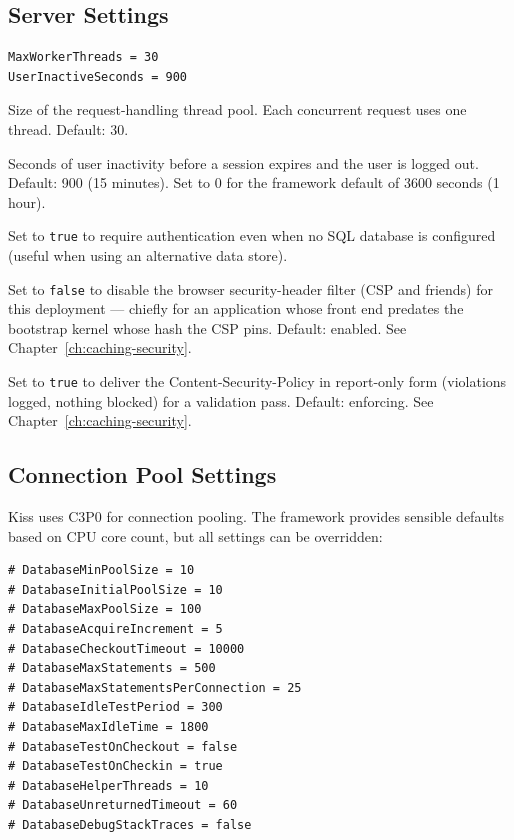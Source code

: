 \subsection{Server Settings}

\begin{lstlisting}[style=ini]
MaxWorkerThreads = 30
UserInactiveSeconds = 900
\end{lstlisting}

\begin{description}[style=nextline]
  \item[\texttt{MaxWorkerThreads}] Size of the request-handling thread pool.  Each concurrent request uses one thread.  Default: 30.
  \item[\texttt{UserInactiveSeconds}] Seconds of user inactivity before a session expires and the user is logged out.  Default: 900 (15 minutes).  Set to 0 for the framework default of 3600 seconds (1 hour).
  \item[\texttt{RequireAuthentication}] Set to \texttt{true} to require authentication even when no SQL database is configured (useful when using an alternative data store).
  \item[\texttt{SecurityHeaders}] Set to \texttt{false} to disable the browser security-header filter (CSP and friends) for this deployment --- chiefly for an application whose front end predates the bootstrap kernel whose hash the CSP pins.  Default: enabled.  See Chapter~\ref{ch:caching-security}.
  \item[\texttt{CspReportOnly}] Set to \texttt{true} to deliver the Content-Security-Policy in report-only form (violations logged, nothing blocked) for a validation pass.  Default: enforcing.  See Chapter~\ref{ch:caching-security}.
\end{description}

\subsection{Connection Pool Settings}

Kiss uses C3P0 for connection pooling.  The framework provides sensible defaults based on CPU core count, but all settings can be overridden:

\begin{lstlisting}[style=ini]
# DatabaseMinPoolSize = 10
# DatabaseInitialPoolSize = 10
# DatabaseMaxPoolSize = 100
# DatabaseAcquireIncrement = 5
# DatabaseCheckoutTimeout = 10000
# DatabaseMaxStatements = 500
# DatabaseMaxStatementsPerConnection = 25
# DatabaseIdleTestPeriod = 300
# DatabaseMaxIdleTime = 1800
# DatabaseTestOnCheckout = false
# DatabaseTestOnCheckin = true
# DatabaseHelperThreads = 10
# DatabaseUnreturnedTimeout = 60
# DatabaseDebugStackTraces = false
\end{lstlisting}

